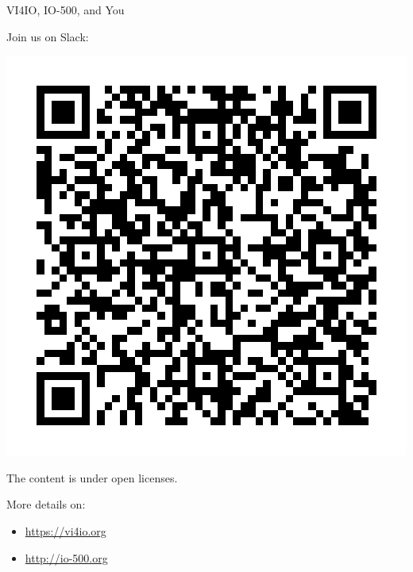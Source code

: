 \documentclass[portrait,a0paper,fontscale=0.4]{baposter}
\newcommand{\compresslist}{%
\setlength{\itemsep}{1pt}%
\setlength{\parskip}{0pt}%
\setlength{\parsep}{0pt}%
}
\begin{document}
\begin{poster}
\begin{posterbox}[name=hpccertification,column=3,below=b4, above=bottom]{VI4IO, IO-500, and You}
\begin{minipage}{0.7\textwidth}
\Large Join us on Slack:
\end{minipage}
\begin{minipage}{0.29\textwidth}
\includegraphics[width=\textwidth]{qr-join-slack-com.pdf}
\end{minipage}

The content is under open licenses.


More details on:

\vspace*{-1.5em}

\begin{itemize}
  \compresslist
  \Large
  \item \url{https://vi4io.org}
  \item \url{http://io-500.org}
\end{itemize}



\end{posterbox}


\end{poster}
\end{document}
